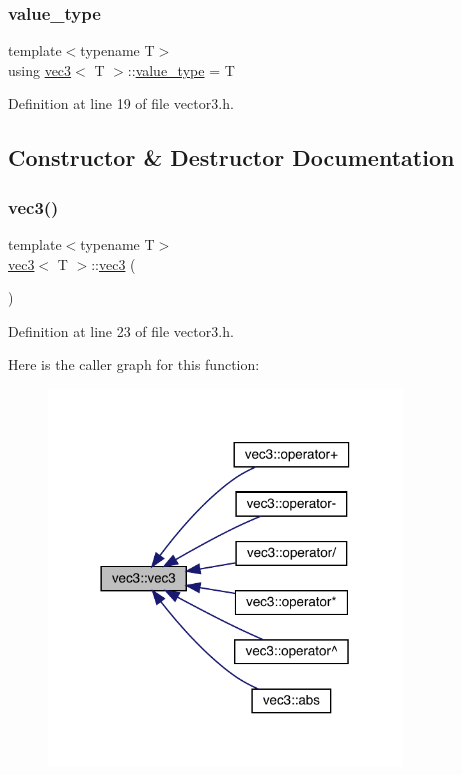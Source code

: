 \subsubsection{\texorpdfstring{value\+\_\+type}{value\_type}}
{\footnotesize\ttfamily template$<$typename T$>$ \\
using \mbox{\hyperlink{structvec3}{vec3}}$<$ T $>$\+::\mbox{\hyperlink{structvec3_a20de853e5a37c5197acba3e136a66735}{value\+\_\+type}} =  T}



Definition at line 19 of file vector3.\+h.



\subsection{Constructor \& Destructor Documentation}
\mbox{\label{structvec3_afb7342872bc442bf0da6a7da1671e77e}} 
\subsubsection{\texorpdfstring{vec3()}{vec3()}\hspace{0.1cm}{\footnotesize\ttfamily [1/3]}}
{\footnotesize\ttfamily template$<$typename T$>$ \\
\mbox{\hyperlink{structvec3}{vec3}}$<$ T $>$\+::\mbox{\hyperlink{structvec3}{vec3}} (\begin{DoxyParamCaption}{ }\end{DoxyParamCaption})\hspace{0.3cm}{\ttfamily [inline]}}



Definition at line 23 of file vector3.\+h.

Here is the caller graph for this function\+:\nopagebreak
\begin{figure}[H]
\begin{center}
\leavevmode
\includegraphics[width=266pt]{structvec3_afb7342872bc442bf0da6a7da1671e77e_icgraph}
\end{center}
\end{figure}
\mbox{\label{structvec3_a9cdcc79d7383d2676ae1f5701c481607}} 
